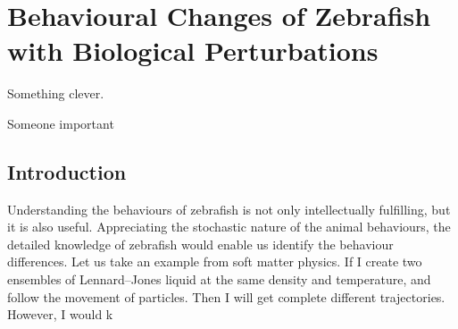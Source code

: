 \documentclass[11pt,twoside]{report}
\begin{document}
\chapter{Behavioural Changes of Zebrafish with Biological Perturbations}

\epigraph{Something clever.}{Someone important}

\section{Introduction}

Understanding the behaviours of zebrafish is not only intellectually fulfilling, but it is also useful. Appreciating the stochastic nature of the animal behaviours, the detailed knowledge of zebrafish would enable us identify the behaviour differences. Let us take an example from soft matter physics. If I create two ensembles of Lennard--Jones liquid at the same density and temperature, and follow the movement of particles. Then I will get complete different trajectories. However, I would k
\end{document}
